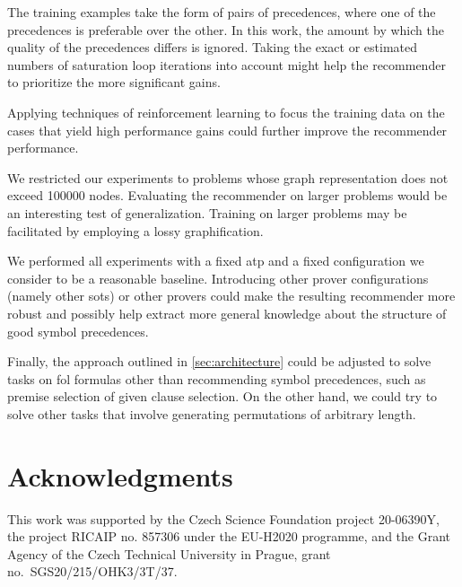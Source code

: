 \documentclass[runningheads]{llncs}
\begin{document}
The training examples take the form of pairs of precedences,
where one of the precedences is preferable over the other.
In this work, the amount by which the quality of the precedences differs is ignored.
Taking the exact or estimated numbers of saturation loop iterations into account
might help the recommender to prioritize the more significant gains.

Applying techniques of reinforcement learning to focus the training data on the cases that yield high performance gains
could further improve the recommender performance.

We restricted our experiments to problems whose graph representation does not exceed \num{100000} nodes.
Evaluating the recommender on larger problems would be an interesting test of generalization.
Training on larger problems may be facilitated by employing a lossy graphification.

We performed all experiments with a fixed \gls{atp} \Vampire{} and a fixed configuration
we consider to be a reasonable baseline.
Introducing other prover configurations (namely other \glspl{sot})
or other provers could make the resulting recommender more robust
and possibly help extract more general knowledge about the structure of good symbol precedences.

Finally, the approach outlined in \cref{sec:architecture}
could be adjusted to solve tasks on \gls{fol} formulas other than recommending symbol precedences,
such as premise selection of given clause selection.
On the other hand, we could try to solve other tasks that involve generating permutations of arbitrary length.

\section*{Acknowledgments}



This work was supported by
the Czech Science Foundation project 20-06390Y,
the project RICAIP no. 857306 under the EU-H2020 programme,
and
the Grant Agency of the Czech Technical University in Prague, grant\\
no.~SGS20/215/OHK3/3T/37.





%
\end{document}
